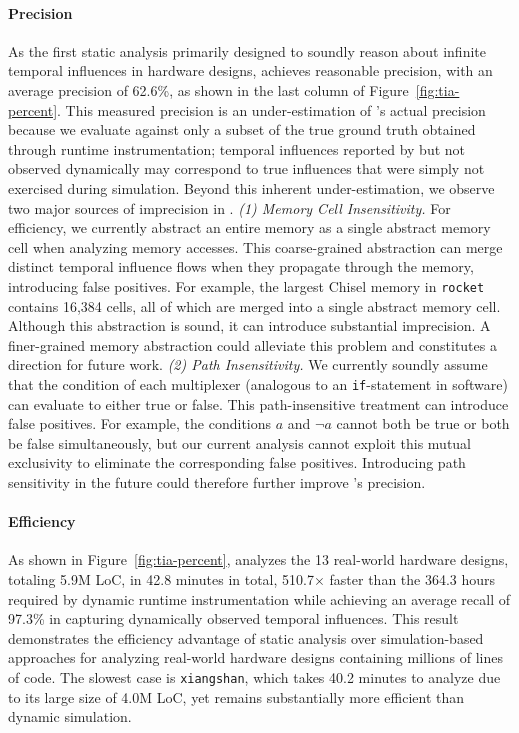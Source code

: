 \paragraph{Precision}
As the first static analysis primarily designed to soundly reason about infinite temporal influences in hardware designs, \tia achieves reasonable precision, with an average precision of 62.6\%, as shown in the last column of Figure~\ref{fig:tia-percent}.
This measured precision is an under-estimation of \tia's actual precision because we evaluate against only a subset of the true ground truth obtained through runtime instrumentation;
temporal influences reported by \tia but not observed dynamically may correspond to true influences that were simply not exercised during simulation.
Beyond this inherent under-estimation, we observe two major sources of imprecision in \tia.
\emph{(1) Memory Cell Insensitivity.}
For efficiency, we currently abstract an entire memory as a single abstract memory cell when analyzing memory accesses.
This coarse-grained abstraction can merge distinct temporal influence flows when they propagate through the memory, introducing false positives.
For example, the largest Chisel memory in \texttt{rocket} contains 16,384 cells, all of which are merged into a single abstract memory cell.
Although this abstraction is sound, it can introduce substantial imprecision.
A finer-grained memory abstraction could alleviate this problem and constitutes a direction for future work.
\emph{(2) Path Insensitivity.}
We currently soundly assume that the condition of each multiplexer (analogous to an \texttt{if}-statement in software) can evaluate to either true or false.
This path-insensitive treatment can introduce false positives.
For example, the conditions $a$ and $\neg a$ cannot both be true or both be false simultaneously, but our current analysis cannot exploit this mutual exclusivity to eliminate the corresponding false positives.
Introducing path sensitivity in the future could therefore further improve \tia's precision.


\paragraph{Efficiency}

As shown in Figure~\ref{fig:tia-percent}, \tia analyzes the 13 real-world hardware designs, totaling 5.9M LoC, in 42.8 minutes in total, 510.7$\times$ faster than the 364.3 hours required by dynamic runtime instrumentation while achieving an average recall of 97.3\% in capturing dynamically observed temporal influences.
This result demonstrates the efficiency advantage of static analysis over simulation-based approaches for analyzing real-world hardware designs containing millions of lines of code.
The slowest case is \texttt{xiangshan}, which takes 40.2 minutes to analyze due to its large size of 4.0M LoC, yet remains substantially more efficient than dynamic simulation.


